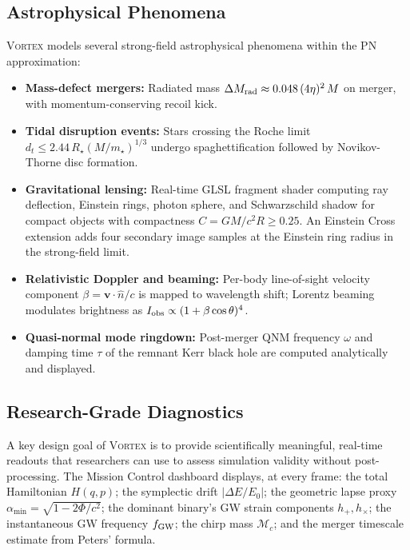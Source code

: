 \documentclass[aps,prd,twocolumn,superscriptaddress,nofootinbib,showpacs,
               longbibliography]{revtex4-2}
\begin{document}
\subsection{Astrophysical Phenomena}
\label{sec:vortex_phenomena}

\textsc{Vortex} models several strong-field astrophysical phenomena
within the PN approximation:
\begin{itemize}[nosep]
  \item \textbf{Mass-defect mergers:}
    Radiated mass $\Delta M_{\rm rad} \approx 0.048\,(4\eta)^2\,M$ on
    merger, with momentum-conserving recoil kick.
  \item \textbf{Tidal disruption events:}
    Stars crossing the Roche limit
    $d_t \leq 2.44\,R_\star(M/m_\star)^{1/3}$ undergo spaghettification
    followed by Novikov-Thorne disc formation.
  \item \textbf{Gravitational lensing:}
    Real-time GLSL fragment shader computing ray deflection, Einstein
    rings, photon sphere, and Schwarzschild shadow for compact objects
    with compactness $C = GM/c^2R \geq 0.25$.
    An Einstein Cross extension adds four secondary image samples
    at the Einstein ring radius in the strong-field limit.
  \item \textbf{Relativistic Doppler and beaming:}
    Per-body line-of-sight velocity component
    $\beta = \mathbf{v}\cdot\hat{n}/c$ is mapped to wavelength shift;
    Lorentz beaming modulates brightness as
    $I_{\rm obs} \propto (1 + \beta\cos\theta)^4$.
  \item \textbf{Quasi-normal mode ringdown:}
    Post-merger QNM frequency $\omega$ and damping time $\tau$ of the
    remnant Kerr black hole are computed analytically and displayed.
\end{itemize}

\subsection{Research-Grade Diagnostics}
\label{sec:vortex_diagnostics}

A key design goal of \textsc{Vortex} is to provide scientifically
meaningful, real-time readouts that researchers can use to assess
simulation validity without post-processing.
The Mission Control dashboard displays, at every frame:
the total Hamiltonian $H(q,p)$;
the symplectic drift $|\Delta E/E_0|$;
the geometric lapse proxy $\alpha_{\min} = \sqrt{1 - 2\Phi/c^2}$;
the dominant binary's GW strain components $h_+, h_\times$;
the instantaneous GW frequency $f_{\rm GW}$;
the chirp mass $\mathcal{M}_c$;
and the merger timescale estimate from Peters' formula.
\end{document}
